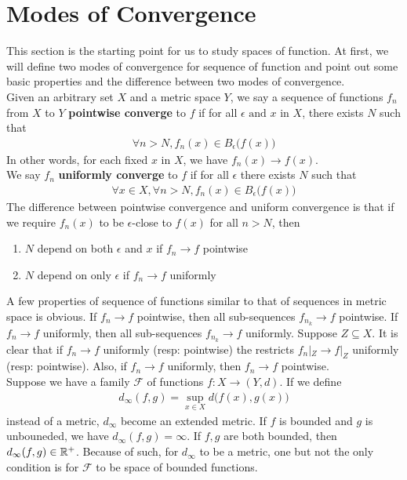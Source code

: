\documentclass{report}
\begin{document}
\section{Modes of Convergence} 
\label{27CaB}
\begin{mdframed}
This section is the starting point for us to study spaces of function. At first, we will define two modes of convergence for sequence of function and point out some basic properties and the difference between two modes of convergence.\\



Given an arbitrary set $X$ and a metric space  $Y$, we say a sequence of functions $f_n$ from $X$ to  $Y$ \textbf{pointwise converge} to $f$ if for all $\epsilon \text{ and }x$ in $X$, there exists $N$ such that 
\begin{align*}
\forall n>N, f_n(x)\in B_{\epsilon }\big(f(x) \big)
\end{align*}
In other words, for each fixed $x$ in $X$, we have $f_n(x)\to f(x)$.\\

We say $f_n$ \textbf{uniformly converge} to $f$ if for all $\epsilon $ there exists $N$ such that 
\begin{align*}
\forall x\in X, \forall n>N, f_n(x)\in B_\epsilon \big(f(x)\big)
\end{align*}
The difference between pointwise convergence and uniform convergence is that if we require $f_n(x)$ to be $\epsilon $-close to $f(x)$ for all $n>N$, then 
\begin{enumerate}[label=(\bullet)]
  \item $N$ depend on both  $\epsilon $ and $x$ if $f_n\to f$ pointwise
  \item $N$ depend on only  $\epsilon $ if $f_n\to f$ uniformly 
\end{enumerate}
A few properties of sequence of functions similar to that of sequences in metric space is obvious. If $f_n\to f$ pointwise, then all sub-sequences  $f_{n_k}\to f$ pointwise. If $f_n \to f$ uniformly, then all sub-sequences $f_{n_k}\to f$ uniformly. Suppose $Z\subseteq X$. It is clear that if $f_n \to f$ uniformly (resp: pointwise) the restricts $f_n|_Z\to f|_Z$ uniformly (resp: pointwise). Also, if $f_n \to f$ uniformly, then $f_n\to f$ pointwise.\\

Suppose we have a family $\mathcal{F}$ of functions $f:X\rightarrow (Y,d)$. If we define 
\begin{align*}
d_{\infty}(f,g)=\sup_{x \in X}d\big(f(x),g(x) \big)
\end{align*}
instead of a metric, $d_{\infty}$ become an extended metric. If $f$ is bounded and  $g$ is unbouneded, we have  $d_{\infty}(f,g)=\infty$. If $f,g$ are both bounded, then  $d_{\infty}(f,g)\in\mathbb{R}^+$. Because of such, for $d_{\infty}$ to be a metric, one but not the only condition is for  $\mathcal{F}$ to be space of bounded functions.\\


\end{mdframed}
\end{document}
